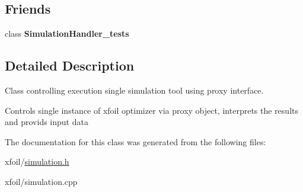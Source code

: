 \subsection*{Friends}
\begin{DoxyCompactItemize}
\item 
\mbox{\label{class_simulation_handler_a51e8de548718ddb89b34351f529b40df}} 
class {\bfseries Simulation\+Handler\+\_\+tests}
\end{DoxyCompactItemize}


\subsection{Detailed Description}
Class controlling execution single simulation tool using proxy interface. 

Controls single instance of xfoil optimizer via proxy object, interprets the results and provids input data 

The documentation for this class was generated from the following files\+:\begin{DoxyCompactItemize}
\item 
xfoil/\hyperlink{simulation_8h}{simulation.\+h}\item 
xfoil/simulation.\+cpp\end{DoxyCompactItemize}

